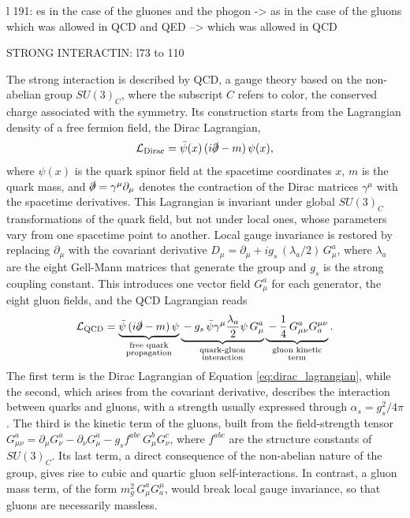 l 191: es in the case of the gluones and the phogon -> as in the case of the gluons
which was allowed in QCD and QED --> which was allowed in QCD



STRONG INTERACTIN: l73 to 110

The strong interaction is described by QCD, a gauge theory based on the non-abelian group $SU(3)_C$, where the subscript $C$ refers to color, the conserved charge associated with the symmetry. Its construction starts from the Lagrangian density of a free fermion field, the Dirac Lagrangian,
\begin{equation}
    \mathcal{L}_{\text{Dirac}} = \bar{\psi}(x)\,(i\slashed{\partial} - m)\,\psi(x),
    \label{eq:dirac_lagrangian}
\end{equation}
%
where $\psi(x)$ is the quark spinor field at the spacetime coordinates $x$, $m$ is the quark mass, and $\slashed{\partial} = \gamma^\mu \partial_\mu$ denotes the contraction of the Dirac matrices $\gamma^\mu$ with the spacetime derivatives. This Lagrangian is invariant under global $SU(3)_C$ transformations of the quark field, but not under local ones, whose parameters vary from one spacetime point to another. Local gauge invariance is restored by replacing $\partial_\mu$ with the covariant derivative $D_\mu = \partial_\mu + i g_s\, (\lambda_a/2)\, G^a_\mu$, where $\lambda_a$ are the eight Gell-Mann matrices that generate the group and $g_s$ is the strong coupling constant. This introduces one vector field $G^a_\mu$ for each generator, the eight gluon fields, and the QCD Lagrangian reads
\begin{equation}
    \mathcal{L}_{\text{QCD}} =
    \underbrace{\bar{\psi}\,(i\slashed{\partial} - m)\,\psi}_{\substack{\text{free quark}\\ \text{propagation}}}
    \underbrace{{}-g_s\, \bar{\psi}\gamma^\mu \frac{\lambda_a}{2}\psi\, G^a_\mu}_{\substack{\text{quark-gluon}\\ \text{interaction}}}
    \underbrace{{}-\frac{1}{4}\, G^a_{\mu\nu} G_a^{\mu\nu}}_{\substack{\text{gluon kinetic}\\ \text{term}}}.
    \label{QCD_Lagrangian}
\end{equation}
%
The first term is the Dirac Lagrangian of Equation \ref{eq:dirac_lagrangian}, while the second, which arises from the covariant derivative, describes the interaction between quarks and gluons, with a strength usually expressed through $\alpha_s = g_s^2/4\pi$. The third is the kinetic term of the gluons, built from the field-strength tensor $G^a_{\mu\nu} = \partial_\mu G^a_\nu - \partial_\nu G^a_\mu - g_s f^{abc}\, G^b_\mu G^c_\nu$, where $f^{abc}$ are the structure constants of $SU(3)_C$. Its last term, a direct consequence of the non-abelian nature of the group, gives rise to cubic and quartic gluon self-interactions. In contrast, a gluon mass term, of the form $m_g^2\, G^a_\mu G_a^\mu$, would break local gauge invariance, so that gluons are necessarily massless.


